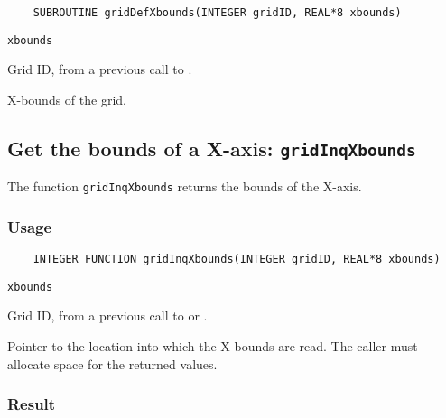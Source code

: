 \begin{verbatim}
    SUBROUTINE gridDefXbounds(INTEGER gridID, REAL*8 xbounds)
\end{verbatim}

\hspace*{4mm}\begin{minipage}[]{15cm}
\begin{deflist}{\tt xbounds\ }
\item[{\tt gridID}]
Grid ID, from a previous call to {}.
\item[{\tt xbounds}]
X-bounds of the grid.

\end{deflist}
\end{minipage}


\subsection{Get the bounds of a X-axis: {\tt gridInqXbounds}}
\label{gridInqXbounds}

The function {\tt gridInqXbounds} returns the bounds of the X-axis.

\subsubsection*{Usage}

\begin{verbatim}
    INTEGER FUNCTION gridInqXbounds(INTEGER gridID, REAL*8 xbounds)
\end{verbatim}

\hspace*{4mm}\begin{minipage}[]{15cm}
\begin{deflist}{\tt xbounds\ }
\item[{\tt gridID}]
Grid ID, from a previous call to {} or {}.
\item[{\tt xbounds}]
Pointer to the location into which the X-bounds are read.
                    The caller must allocate space for the returned values.

\end{deflist}
\end{minipage}

\subsubsection*{Result}

